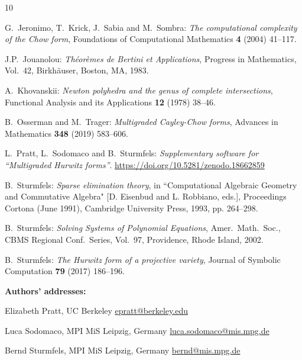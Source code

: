 \documentclass[12pt]{article}
\theoremstyle{definition}
\begin{document}
\begin{thebibliography}{10}
\begin{small}
G.~Jeronimo, T.~Krick, J.~Sabia and M.~Sombra:
{\em The computational complexity of the Chow form}, 
Foundations of Computational Mathematics {\bf 4} (2004)
41--117.

J.P.~Jouanolou: {\em Th\'{e}or\`{e}mes de Bertini et Applications}, Progress in Mathematics, Vol.~42, Birkh\"{a}user,
  Boston, MA, 1983.

A.~Khovanskii:  {\em Newton polyhedra and the genus of complete intersections},
Functional Analysis and its Applications {\bf 12} (1978) 38--46.

 B.~Osserman and M.~Trager: {\em Multigraded Cayley-Chow forms},
Advances in Mathematics {\bf 348} (2019) 583--606.

L.~Pratt, L.~Sodomaco and B.~Sturmfels: {\em Supplementary software for ``Multigraded Hurwitz forms''}.
\url{https://doi.org/10.5281/zenodo.18662859}

B.~Sturmfels:
{\em Sparse elimination theory},
in ``Computational Algebraic Geometry and Commutative Algebra" [D. Eisenbud and L. Robbiano, eds.], 
Proceedings Cortona (June 1991), Cambridge University Press, 1993, pp. 264--298.
 	
 B.~Sturmfels: 
{\em Solving Systems of Polynomial Equations}, Amer.~Math.~Soc., CBMS Regional Conf.~Series, 
Vol.~97, Providence, Rhode Island, 2002.
	
B.~Sturmfels: {\em The Hurwitz form of a projective variety},
Journal of Symbolic Computation {\bf 79} (2017) 186--196.

\end{small}
\end{thebibliography}

\bigskip \medskip \bigskip

\noindent
\footnotesize {\bf Authors' addresses:}
\smallskip

\noindent Elizabeth Pratt, UC Berkeley \hfill \url{epratt@berkeley.edu}

\noindent Luca Sodomaco, MPI MiS Leipzig, Germany \hfill \url{luca.sodomaco@mis.mpg.de}

\noindent Bernd Sturmfels, MPI MiS Leipzig, Germany \hfill \url{bernd@mis.mpg.de}
	
\end{document}
